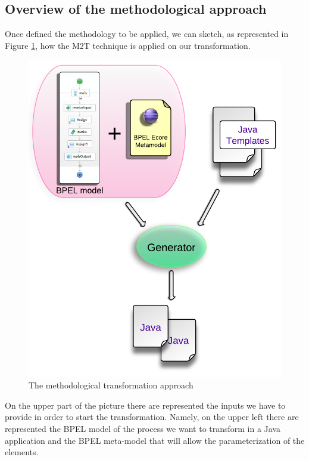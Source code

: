 \subsection{Overview of the methodological approach}
\label{MethodologyOverview}
Once defined the methodology to be applied, we can sketch, as represented in Figure \ref{fig:TransformationApproach}, how the M2T technique is applied on our transformation.
\begin{figure}[ht]
  \begin{center}
    \includegraphics[scale=0.9]{pictures/TransformationApproach.png}
    \caption{The methodological transformation approach}
    \label{fig:TransformationApproach}
  \end{center}
\end{figure}
On the upper part of the picture there are represented the inputs we have to provide in order to start the transformation. Namely, on the upper left there are represented the BPEL model of the process we want to transform in a Java application and the BPEL meta-model that will allow the parameterization of the elements. 
